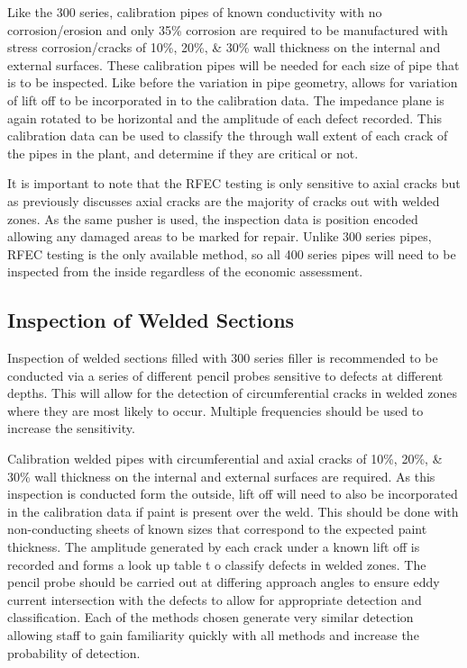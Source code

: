 \documentclass[a4paper,twoside,11pt]{article}
\begin{document}
Like the 300 series, calibration pipes of known conductivity with no corrosion/erosion and only 35\% corrosion are required to be manufactured with stress corrosion/cracks of 10\%, 20\%, \& 30\% wall thickness on the internal and external surfaces. These calibration pipes will be needed for each size of pipe that is to be inspected. 
Like before the variation in pipe geometry, allows for variation of lift off to be incorporated in to the calibration data.
The impedance plane is again rotated to be horizontal and the amplitude of each defect recorded. 
This calibration data can be used to classify the through wall extent of each crack of the pipes in the plant, and determine if they are critical or not.

It is important to note that the RFEC testing is only sensitive to axial cracks \cite{eddyfiRemoteFieldTestingRFT} but as previously discusses axial cracks are the majority of cracks out with welded zones. 
As the same pusher is used, the inspection data is position encoded allowing any damaged areas to be marked for repair. Unlike 300 series pipes, RFEC testing is the only available method, so all 400 series pipes will need to be inspected from the inside regardless of the economic assessment.


\subsection{Inspection of Welded Sections}

Inspection of welded sections filled with 300 series filler is recommended to be conducted via a series of different pencil probes sensitive to defects at different depths. This will allow for the detection of circumferential cracks in welded zones where they are most likely to occur. Multiple frequencies should be used to increase the sensitivity. 

Calibration welded pipes with circumferential and axial cracks of 10\%, 20\%, \& 30\% wall thickness on the internal and external surfaces are required. 
As this inspection is conducted form the outside, lift off will need to also be incorporated in the calibration data if paint is present over the weld. 
This should be done with non-conducting sheets of known sizes that correspond to the expected paint thickness.
The amplitude generated by each crack under a known lift off is recorded and forms a look up table t o classify defects in welded zones.
The pencil probe should be carried out at differing approach angles to ensure eddy current intersection with the defects to allow for appropriate detection and classification.
Each of the methods chosen generate very similar detection allowing staff to gain familiarity quickly with all methods and increase the probability of detection.
\end{document}
